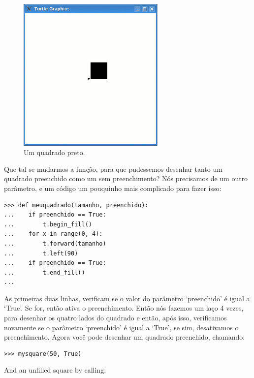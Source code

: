 \begin{figure}
\begin{center}
\includegraphics[width=72mm]{eps/figure27.eps}
\end{center}
\caption{Um quadrado preto.}\label{fig27}
\end{figure}

Que tal se mudarmos a função, para que pudessemos desenhar tanto um quadrado preenchido como um sem preenchimento? Nós precisamos de um outro parâmetro, e um código um pouquinho mais complicado para fazer isso:

\begin{listing}
\begin{verbatim}
>>> def meuquadrado(tamanho, preenchido):
...    if preenchido == True:
...        t.begin_fill()
...    for x in range(0, 4):
...        t.forward(tamanho)
...        t.left(90)
...    if preenchido == True:
...        t.end_fill()
...
\end{verbatim}
\end{listing}

As primeiras duas linhas, verificam se o valor do parâmetro `preenchido' é igual a `True'. Se for, então ativa o preenchimento. Então nós fazemos um laço 4 vezes, para desenhar os quatro lados do quadrado e então, após isso, verificamos novamente se o parâmetro `preenchido' é igual a `True', se sim, desativamos o preenchimento. Agora você pode desenhar um quadrado preenchido, chamando:

\begin{listing}
\begin{verbatim}
>>> mysquare(50, True)
\end{verbatim}
\end{listing}

\noindent
And an unfilled square by calling:

